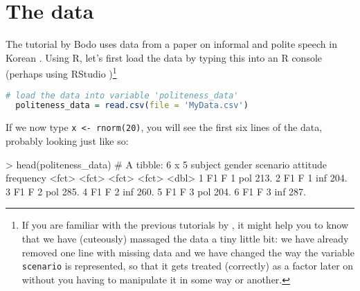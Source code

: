 \documentclass[fleqn,reqno,12pt]{article}
\newcommand{\ri}[1]{\lstinline{#1}}  %
\begin{document}
\section{The data}

The tutorial by Bodo \citet{Winter2013:Linear-models-a} uses data from a paper on informal and polite speech in Korean \citep{WinterGrawunder2012:The-Phonetic-Pr}. Using R, let's first load the data by typing this into an R console (perhaps using RStudio )\footnote{If you are familiar with the previous tutorials by \citet{Winter2013:Linear-models-a}, it might help you to know that we have (cuteously) massaged the data a tiny little bit: we have already removed one line with missing data and we have changed the way the variable \texttt{scenario} is represented, so that it gets treated (correctly) as a factor later on without you having to manipulate it in some way or another.}

\begin{lstlisting}[language=R]
  # load the data into variable 'politeness_data'
  politeness_data = read.csv(file = 'MyData.csv')     
\end{lstlisting}

If we now type \ri{x <- rnorm(20)}, you will see the first six lines of the data, probably looking just like so:

\medskip


\begin{rc}
> head(politeness_data)
# A tibble: 6 x 5
  subject gender scenario attitude frequency
  <fct>   <fct>  <fct>    <fct>        <dbl>
1 F1      F      1        pol           213.
2 F1      F      1        inf           204.
3 F1      F      2        pol           285.
4 F1      F      2        inf           260.
5 F1      F      3        pol           204.
6 F1      F      3        inf           287.
\end{rc}


\printbibliography[heading=bibintoc]
\end{document}
